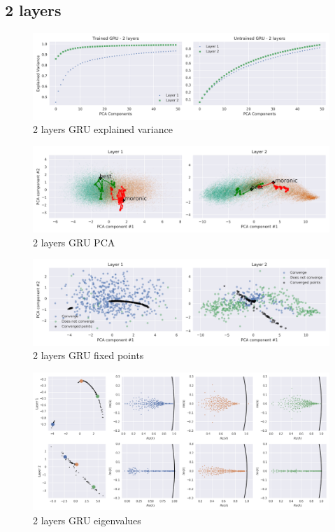 \documentclass{article}
\begin{document}
\subsection{2 layers}
\label{anx:2-layers}
\begin{figure}[H]
  \centering
  \includegraphics[width=\textwidth]{../images/gru_2layer_100_explained_variance.png}
  \caption{2 layers GRU explained variance}
  \label{fig:-images-gru_2layer_explained_variance-png}
\end{figure}
\begin{figure}[H]
  \centering
  \includegraphics[width=\textwidth]{../images/gru_2layer_100_PCA.png}
  \caption{2 layers GRU PCA}
  \label{fig:-images-gru_2layer_PCA-png}
\end{figure}
\begin{figure}[H]
  \centering
  \includegraphics[width=\textwidth]{../images/gru_2layer_100_fixed_points.png}
  \caption{2 layers GRU fixed points}
  \label{fig:-images-gru_2layer_fixed_points-png}
\end{figure}
\begin{figure}[H]
  \centering
  \includegraphics[width=\textwidth]{../images/gru_2layer_100_eig.png}
  \caption{2 layers GRU eigenvalues}
  \label{fig:-images-gru_2layer_eig-png}
\end{figure}
\end{document}
